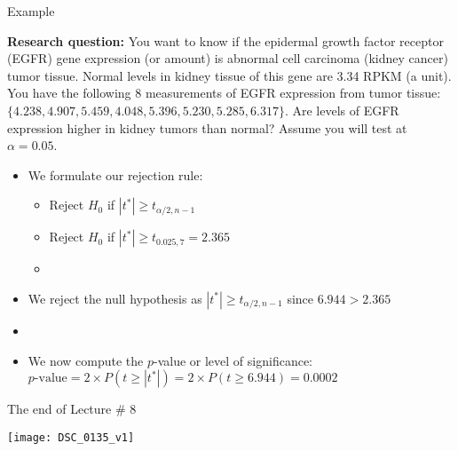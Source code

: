 \documentclass[xcolor=dvipsnames]{beamer}
\begin{document}
\begin{frame}{Example}

{\scriptsize  \textbf{Research question:} You want to know if the epidermal growth factor receptor (EGFR) gene expression (or amount) is abnormal cell carcinoma (kidney cancer) tumor tissue. Normal levels in kidney tissue of this gene are 3.34 RPKM (a unit). You have the following 8 measurements of EGFR expression from tumor tissue: $\{4.238, 4.907, 5.459, 4.048, 5.396, 5.230, 5.285, 6.317\}$. Are levels of EGFR expression higher in kidney tumors than normal? Assume you will test at $\alpha = 0.05$.}

\begin{itemize}
	\item We formulate our rejection rule:   \pause
	\begin{itemize}
		\item Reject $H_0$ if $|t^*| \geq t_{\alpha / 2, n-1}$  \pause
		\item Reject $H_0$ if $|t^*| \geq t_{0.025, 7} = 2.365$  \pause
		\item[] 
	\end{itemize}
	\item We reject the null hypothesis as $|t^*| \geq t_{\alpha / 2, n-1}$ since $6.944 > 2.365$  \pause
	\item[]
	\item We now compute the $p$-value or level of significance: $p\text{-value}=2 \times P(t \geq |t^*|) = 2\times P(t \geq 6.944) = 0.0002$
\end{itemize}
\end{frame}

\begin{frame}{The end of Lecture \# 8}
	\begin{center}
		\texttt{[image: DSC\_0135\_v1]}
	\end{center}
\end{frame}
\end{document}

